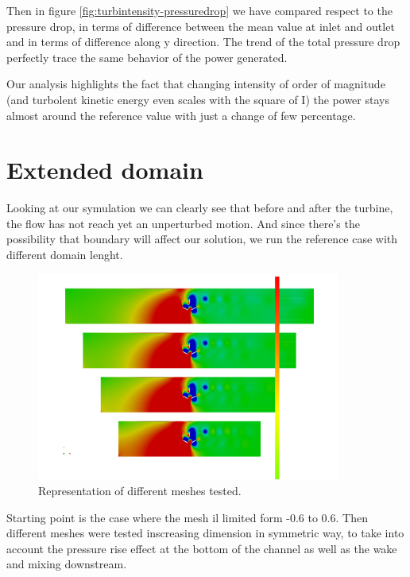 \documentclass[a4paper,12pt]{article}
\begin{document}
Then in figure \ref{fig:turbintensity-pressuredrop} we have compared respect to the pressure drop, in terms of difference between the mean value at inlet and outlet and in terms of difference along y direction.
The trend of the total pressure drop perfectly trace the same behavior of the power generated.

Our analysis highlights the fact that changing intensity of order of magnitude (and turbolent kinetic energy even scales with the square of I) the power stays almost around the reference value with just a change of few percentage.


\section{Extended domain}
Looking at our symulation we can clearly see that before and after the turbine, the flow has not reach yet an unperturbed motion. And since there's the possibility that boundary will affect our solution, we run the reference case with different domain lenght. 

\begin{figure}[H]
\centering
\includegraphics[width=10cm]{images/longmesh/confronto_mesh_long.png}
\caption{Representation of different meshes tested.}
\end{figure}

Starting point is the case where the mesh il limited form -0.6 to 0.6. 
Then different meshes were tested inscreasing dimension in symmetric way, to take into account the pressure rise effect at the bottom of the channel as well as the wake and mixing downstream. 
\end{document}
